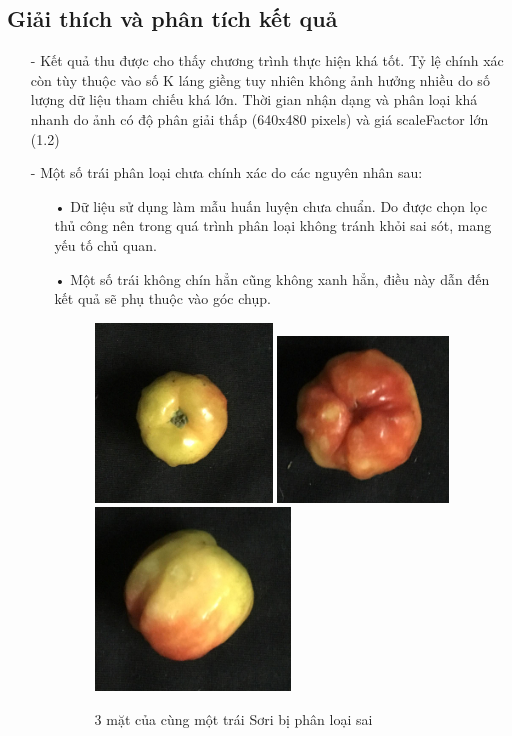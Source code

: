 \documentclass[12pt,a4paper]{article}
\begin{document}
\subsection{Giải thích và phân tích kết quả}
\begin{itemize}
\item[-] Kết quả thu được cho thấy chương trình thực hiện khá tốt. Tỷ lệ chính xác còn tùy thuộc vào số K láng giềng tuy nhiên không ảnh hưởng nhiều do số lượng dữ liệu tham chiếu khá lớn. Thời gian nhận dạng và phân loại khá nhanh do ảnh có độ phân giải thấp (640x480 pixels) và giá scaleFactor lớn (1.2)
\item[-] Một số trái phân loại chưa chính xác do các nguyên nhân sau:
\begin{itemize}
\item[•] Dữ liệu sử dụng làm mẫu huấn luyện chưa chuẩn. Do được chọn lọc thủ công nên trong quá trình phân loại không tránh khỏi sai sót, mang yếu tố chủ quan.
\item[•] Một số trái không chín hẳn cũng không xanh hẳn, điều này dẫn đến kết quả sẽ phụ thuộc vào góc chụp.
\begin{center}
    \begin{figure}[htp]
    \begin{center}
    \includegraphics[scale=.8]{Images/tren}
    \includegraphics[scale=.8]{Images/duoi}
    \includegraphics[scale=.8]{Images/ngang}
    \end{center}
    \caption{3 mặt của cùng một trái Sơri bị phân loại sai}
    \end{figure}
\end{center}
\end{itemize}
\end{itemize}
\end{document}
